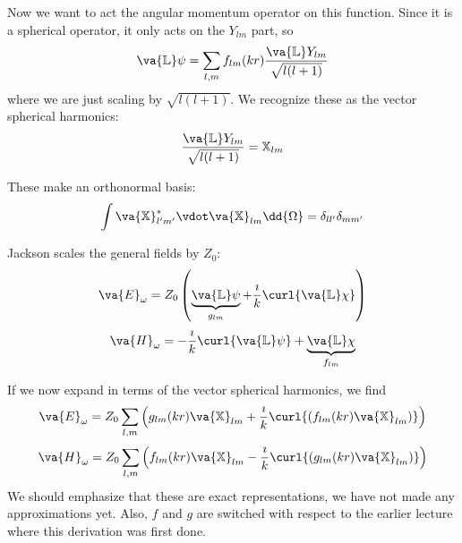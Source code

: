 \documentclass[a4paper,twoside,master.tex]{subfiles}
\begin{document}
Now we want to act the angular momentum operator on this function. Since it is a spherical operator, it only acts on the $ Y_{lm} $ part, so
\begin{equation}
    \va{\mathbb{L}} \psi = \sum_{l,m} f_{lm}(kr) \frac{ \va{\mathbb{L}} Y_{lm}}{\sqrt{l(l+1)}}
\end{equation}
where we are just scaling by $ \sqrt{l(l+1)} $. We recognize these as the vector spherical harmonics:
\begin{equation}
    \frac{ \va{\mathbb{L}} Y_{lm}}{\sqrt{l(l+1)}} = \mathbb{X}_{lm}
\end{equation}

These make an orthonormal basis:
\begin{equation}
    \int \va{\mathbb{X}}^*_{l'm'} \vdot \va{\mathbb{X}}_{lm} \dd{\Omega} = \delta_{ll'} \delta_{mm'}
\end{equation}

Jackson scales the general fields by $ Z_0 $:
\begin{equation}
    \va{E}_{\omega} = Z_0 \left( \underbrace{\va{\mathbb{L}} \psi}_{g_{lm}} + \frac{\imath}{k} \curl{ \va{\mathbb{L}} \chi} \right)
\end{equation}
\begin{equation}
    \va{H}_{\omega} = - \frac{\imath}{k} \curl{ \va{\mathbb{L}} \psi} + \underbrace{\va{\mathbb{L}} \chi}_{f_{lm}}
\end{equation}

If we now expand in terms of the vector spherical harmonics, we find
\begin{equation}
    \va{E}_{\omega} = Z_0 \sum_{l,m} \left( g_{lm}(kr) \va{\mathbb{X}}_{lm} + \frac{\imath}{k} \curl{ (f_{lm}(kr) \va{\mathbb{X}}_{lm})} \right)
\end{equation}
\begin{equation}
    \va{H}_{\omega} = Z_0 \sum_{l,m} \left( f_{lm}(kr) \va{\mathbb{X}}_{lm} - \frac{\imath}{k} \curl{ (g_{lm}(kr) \va{\mathbb{X}}_{lm})} \right)
\end{equation}
We should emphasize that these are exact representations, we have not made any approximations yet. Also, $ f $ and $ g $ are switched with respect to the earlier lecture where this derivation was first done.
\end{document}
